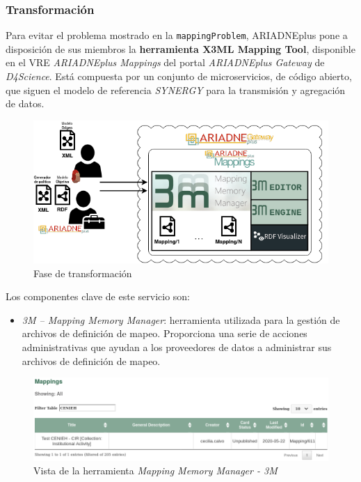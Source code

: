 \documentclass[
]{article}
\providecommand{\tightlist}{%
  \setlength{\itemsep}{0pt}\setlength{\parskip}{0pt}}
\begin{document}
\hypertarget{transformaciuxf3n}{%
\subsubsection{Transformación}\label{transformaciuxf3n}}

Para evitar el problema mostrado en la \texttt{mappingProblem},
ARIADNEplus pone a disposición de sus miembros la \textbf{herramienta
X3ML Mapping Tool}, disponible en el VRE \emph{ARIADNEplus Mappings} del
portal \emph{ARIADNEplus Gateway} de \emph{D4Science}. Está compuesta
por un conjunto de microservicios, de código abierto, que siguen el
modelo de referencia \emph{SYNERGY} para la transmisión y agregación de
datos.

\begin{figure}
\hypertarget{transformARIADNE}{%
\centering
\includegraphics{../_static/images/transformARIADNE.png}
\caption{Fase de transformación}\label{transformARIADNE}
}
\end{figure}

Los componentes clave de este servicio son:

\begin{itemize}
\tightlist
\item
  \emph{3M -- Mapping Memory Manager}: herramienta utilizada para la
  gestión de archivos de definición de mapeo. Proporciona una serie de
  acciones administrativas que ayudan a los proveedores de datos a
  administrar sus archivos de definición de mapeo.
\end{itemize}

\begin{figure}
\hypertarget{mmm3m}{%
\centering
\includegraphics{../_static/images/mmm3m.png}
\caption{Vista de la herramienta \emph{Mapping Memory Manager -
3M}}\label{mmm3m}
}
\end{figure}
\end{document}
